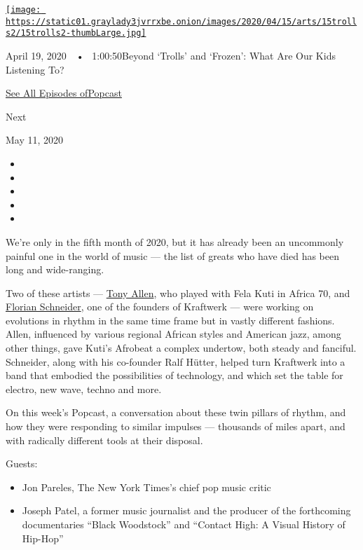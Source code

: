 \href{https://www.nytimes3xbfgragh.onion/2020/04/19/arts/music/popcast-kids-music.html?action=click\&module=audio-series-bar\&region=header\&pgtype=Article}{\texttt{[image: https://static01.graylady3jvrrxbe.onion/images/2020/04/15/arts/15trolls2/15trolls2-thumbLarge.jpg]}}

April 19, 2020~~•~ 1:00:50Beyond `Trolls' and `Frozen': What Are Our
Kids Listening To?

\href{https://www.nytimes3xbfgragh.onion/column/popcast-pop-music-podcast}{See
All Episodes ofPopcast}

Next

May 11, 2020

\begin{itemize}
\item
\item
\item
\item
\item
\end{itemize}

We're only in the fifth month of 2020, but it has already been an
uncommonly painful one in the world of music --- the list of greats who
have died has been long and wide-ranging.

Two of these artists ---
\href{https://www.nytimes3xbfgragh.onion/2020/05/02/arts/music/tony-allen-dead.html}{Tony
Allen}, who played with Fela Kuti in Africa 70, and
\href{https://www.nytimes3xbfgragh.onion/2020/05/06/arts/music/florian-schneider-kraftwerk-dead.html}{Florian
Schneider}, one of the founders of Kraftwerk --- were working on
evolutions in rhythm in the same time frame but in vastly different
fashions. Allen, influenced by various regional African styles and
American jazz, among other things, gave Kuti's Afrobeat a complex
undertow, both steady and fanciful. Schneider, along with his co-founder
Ralf Hütter, helped turn Kraftwerk into a band that embodied the
possibilities of technology, and which set the table for electro, new
wave, techno and more.

On this week's Popcast, a conversation about these twin pillars of
rhythm, and how they were responding to similar impulses --- thousands
of miles apart, and with radically different tools at their disposal.

Guests:

\begin{itemize}
\item
  Jon Pareles, The New York Times's chief pop music critic
\item
  Joseph Patel, a former music journalist and the producer of the
  forthcoming documentaries ``Black Woodstock'' and ``Contact High: A
  Visual History of Hip-Hop''
\end{itemize}

